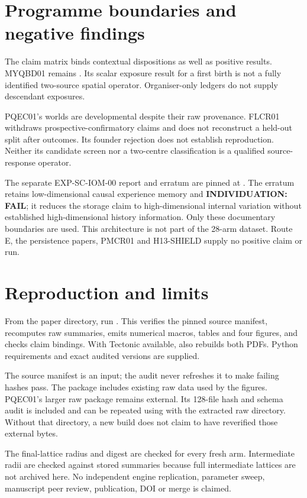 \documentclass[11pt]{article}
\begin{document}
\section{Programme boundaries and negative findings}
The claim matrix binds contextual dispositions as well as positive results.
MYQBD01 remains .
Its scalar exposure result for a first birth is not a fully identified two-source spatial
operator. Organiser-only ledgers do not supply descendant exposures.

PQEC01's \VPQArchives{} worlds are developmental despite their raw provenance.
FLCR01 withdraws prospective-confirmatory claims and does not reconstruct a held-out split
after outcomes. Its founder rejection does not establish reproduction.
Neither its candidate screen nor a two-centre classification is a qualified source-response operator.

The separate EXP-SC-IOM-00 report and erratum are pinned at
.
The erratum retains low-dimensional causal experience memory and
\textbf{INDIVIDUATION: FAIL}; it reduces the storage claim to high-dimensional internal
variation without established high-dimensional history information.
Only these documentary boundaries are used. This architecture is not part of the
28-arm dataset. Route E, the persistence papers, PMCR01 and H13-SHIELD supply no positive claim or run.

\section{Reproduction and limits}
From the paper directory, run .
This verifies the pinned source manifest, recomputes raw summaries, emits numerical macros,
tables and four figures, and checks claim bindings.
With Tectonic available, 
also rebuilds both PDFs. Python requirements and exact audited versions are supplied.

The source manifest is an input; the audit never refreshes it to make failing hashes pass.
The package includes existing raw data used by the figures.
PQEC01's larger raw package remains external. Its 128-file hash and schema audit is included
and can be repeated using  with the extracted raw directory.
Without that directory, a new build does not claim to have reverified those external bytes.

The final-lattice radius and digest are checked for every fresh arm.
Intermediate radii are checked against stored summaries because full intermediate
lattices are not archived here.
No independent engine replication, parameter sweep, manuscript peer review,
publication, DOI or merge is claimed.
\end{document}
